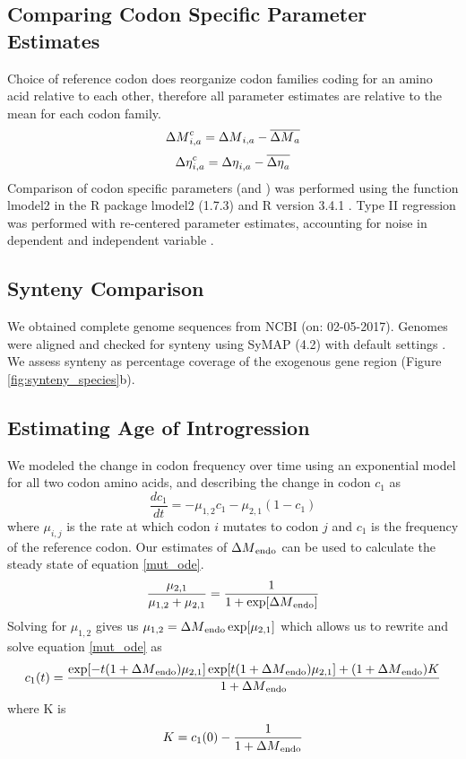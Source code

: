 \subsection{Comparing Codon Specific Parameter Estimates}
Choice of reference codon does reorganize codon families coding for an amino acid relative to each other, therefore all parameter estimates are relative to the mean for each codon family.
\begin{equation}
{\Delta M}_{i,a}^c = {\Delta M}_{i,a} - \overline{{\Delta M}_a}
\end{equation}
\begin{equation}
{\Delta \eta}_{i,a}^c = {\Delta \eta}_{i,a} - \overline{{\Delta \eta}_a}
\end{equation}
Comparison of codon specific parameters (\DM and \DE) was performed using the function lmodel2 in the R package lmodel2 (1.7.3) \citep{lmodel2} and R version 3.4.1 \citep{rcore}.
Type II regression was performed with re-centered parameter estimates, accounting for noise in dependent and independent variable \citep{SokalAndRohlf1981}.


\subsection{Synteny Comparison}
We obtained complete genome sequences from NCBI (on: 02-05-2017).
Genomes were aligned and checked for synteny using SyMAP (4.2) with default settings \citep{soderlund2006, soderlund2011}.
We assess synteny as percentage coverage of the exogenous gene region (Figure \ref{fig:synteny_species}b).

\subsection{Estimating Age of Introgression}
We modeled the change in codon frequency over time using an exponential model for all two codon amino acids, and describing the change in codon $c_1$ as
\begin{equation}
\frac{d c_1}{d t} = -\mu_{1,2}c_1 - \mu_{2,1}(1-c_1)
\label{mut_ode}
\end{equation}
where $\mu_{i,j}$ is the rate at which codon $i$ mutates to codon $j$ and $c_1$ is the frequency of the reference codon.
Our estimates of ${\Delta M}_\text{endo}$ can be used to calculate the steady state of equation \ref{mut_ode}.
\begin{equation}
\frac{\mu_{2,1}}{\mu_{1,2} + \mu_{2,1}} = \frac{1}{1+\exp[{\Delta M}_\text{endo}]}
\end{equation}
Solving for $\mu_{1,2}$ gives us $\mu_{1,2} = {\Delta M}_\text{endo}\exp[\mu_{2,1}]$ which allows us to rewrite and solve equation \ref{mut_ode} as
\begin{equation}
c_1(t) = \frac{\exp[-t(1+{\Delta M}_\text{endo})\mu_{2,1}]\exp[t(1+{\Delta M}_\text{endo})\mu_{2,1}] + (1+{\Delta M}_\text{endo})K}{1+{\Delta M}_\text{endo}}
\label{mut_close_form}
\end{equation}
where K is
\begin{equation}
K = c_1(0) - \frac{1}{1+{\Delta M}_\text{endo}}
\end{equation}


